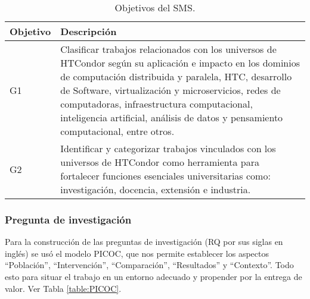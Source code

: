 \begin{table}[htbp]

	\centering
	\renewcommand{\arraystretch}{1.7}  %
	\setlength{\tabcolsep}{3pt}      %
	\vspace{10pt}                     %
	\begin{tabular}{|>{\arraybackslash}m{1cm}|>{\arraybackslash}m{7cm}|}
		\hline
		\textbf{Objetivo} & \textbf{Descripción}                                                                                                                                                                                                                                                                                                                                         \\
		\hline
		G1                & Clasificar trabajos relacionados con los universos de HTCondor según su aplicación e impacto en los dominios de computación distribuida y paralela, HTC, desarrollo de Software, virtualización y microservicios, redes de computadoras, infraestructura computacional, inteligencia artificial, análisis de datos y pensamiento computacional, entre otros. \\
		\hline
		G2                & Identificar y categorizar trabajos vinculados con los universos de HTCondor como herramienta para fortalecer funciones esenciales universitarias como: investigación, docencia, extensión e industria.                                                                                                                                                       \\
		\hline
	\end{tabular}
	\vspace{6pt}  %
	\caption{Objetivos del SMS.}
	\label{table:Goals}

\end{table}

\subsubsection{Pregunta de investigación}
Para la construcción de las preguntas de investigación (RQ por sus siglas en inglés) se usó el modelo PICOC, que nos permite establecer los aspectos ``Población'', ``Intervención'', ``Comparación'', ``Resultados'' y ``Contexto''. Todo esto para situar el trabajo en un entorno adecuado y propender por la entrega de valor. Ver Tabla \ref{table:PICOC}.

